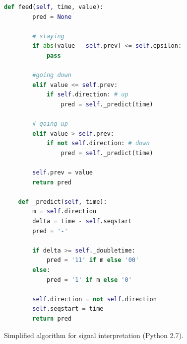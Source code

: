 \begin{figure}
\centering
\begin{lstlisting}[language=Python, frame={}]
	def feed(self, time, value):
		pred = None
		
		# staying
		if abs(value - self.prev) <= self.epsilon:
			pass

		#going down
		elif value <= self.prev: 
			if self.direction: # up	
				pred = self._predict(time)

		# going up
		elif value > self.prev: 
			if not self.direction: # down
				pred = self._predict(time)

		self.prev = value
		return pred
		
	def _predict(self, time):
		m = self.direction
		delta = time - self.seqstart
		pred = '-'
		
		if delta >= self._doubletime:
			pred = '11' if m else '00'
		else:
			pred = '1' if m else '0'

		self.direction = not self.direction
		self.seqstart = time
		return pred
\end{lstlisting}
\caption{Simplified algorithm for signal interpretation (Python 2.7).}
\label{code}
\end{figure}